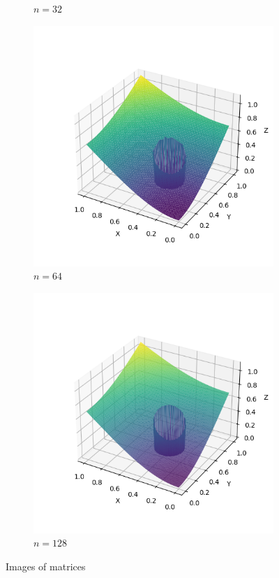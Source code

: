 \documentclass[lang=cn,a4paper,newtx,bibend=bibtex]{elegantpaper}
\begin{document}
\begin{figure}[H]
\begin{subfigure}[b]{0.18\textwidth}
      \caption{$n = 32$}
  \end{subfigure}
  \hfill
  \begin{subfigure}[b]{0.18\textwidth}
      \includegraphics[width=\textwidth]{../../res_bac/res-[data|3-Dirichlet-irregular-d64].png}
      \caption{$n = 64$}
  \end{subfigure}
  \hfill
  \begin{subfigure}[b]{0.18\textwidth}
      \includegraphics[width=\textwidth]{../../res_bac/res-[data|3-Dirichlet-irregular-e128].png}
      \caption{$n = 128$}
  \end{subfigure}
  \caption{Images of matrices}\label{fig:matrices}
\end{figure}
\end{document}
